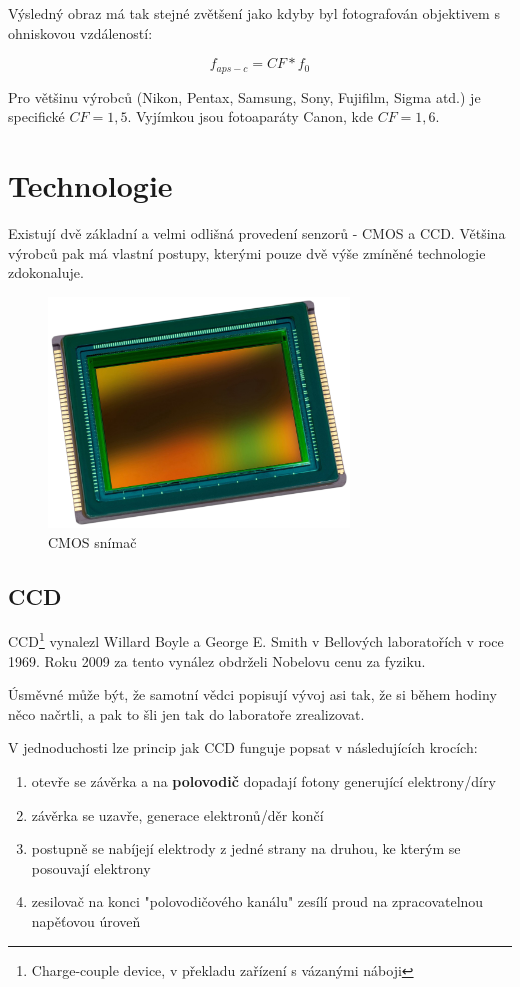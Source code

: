 \documentclass[12pt,a4paper,titlepage,final]{report}
\begin{document}
Výsledný obraz má tak stejné zvětšení jako kdyby byl fotografován objektivem s ohniskovou vzdáleností:

$$f_{aps-c} = CF * f_{0}$$

Pro většinu výrobců (Nikon, Pentax, Samsung, Sony, Fujifilm, Sigma atd.) je specifické $CF = 1,5$. Vyjímkou jsou fotoaparáty Canon, kde $CF = 1,6$.

\section{Technologie}

Existují dvě základní a velmi odlišná provedení senzorů - CMOS a CCD. Většina výrobců pak má vlastní postupy, kterými pouze dvě výše zmíněné 
technologie zdokonaluje.

\begin{figure}[ht]
\begin{center}
\includegraphics[width=8cm]{images/cmos-real.jpg}
\caption{CMOS snímač}
\label{fig:cmos-real}
\end{center}
\end{figure}

\subsection{CCD}\label{sebsec:ccd}

CCD\footnote{Charge-couple device, v překladu zařízení s vázanými náboji} vynalezl Willard Boyle a George E. Smith v Bellových laboratořích v roce 1969. Roku 2009 za tento vynález obdrželi Nobelovu cenu za fyziku.

Úsměvné může být, že samotní vědci popisují vývoj asi tak, že si během hodiny něco načrtli, a pak to šli jen tak do laboratoře zrealizovat.

V jednoduchosti lze princip jak CCD funguje popsat v následujících krocích: 

		\begin{enumerate}		
			\item otevře se závěrka a na \textbf{polovodič} dopadají fotony generující elektrony/díry
			\item závěrka se uzavře, generace elektronů/děr končí
			\item postupně se nabíjejí elektrody z jedné strany na druhou, ke kterým se posouvají elektrony
			\item zesilovač na konci "polovodičového kanálu" zesílí proud na zpracovatelnou napěťovou úroveň
		\end{enumerate}	
		
\end{document}
